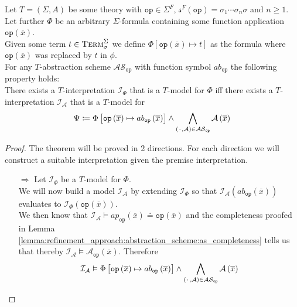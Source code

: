 \begin{theorem}
\label{theorem:abstractions:scheme:equivalence}
Let $T=\left(\Sigma,A\right)$ be some theory with $\texttt{op}\in\Sigma^F$, $\mathcal{s}^F\left(\texttt{op}\right)=\sigma_1\dotsi\sigma_n\sigma$ and $n\geq1$.\\
Let further $\Phi$ be an arbitrary $\Sigma$-formula containing some function application $\texttt{op}\left(\overline{x}\right)$.\\
Given some term $t\in\textsc{Term}_\sigma^\Sigma$ we define $\Phi\left[\texttt{op}\left(\overline{x}\right)\mapsto t \right]$ as the formula where $\texttt{op}\left(\overline{x}\right)$ was replaced by $t$ in $\phi$.\\
For any $T$-abstraction scheme $\mathcal{AS}_{\texttt{op}}$ with function symbol $ab_{\texttt{op}}$ the following property holds:\\
There exists a $T$-interpretation $\mathcal{I}_{\Phi}$ that is a $T$-model for $\Phi$ iff there exists a $T$-interpretation $\mathcal{I}_{\mathcal{A}}$ that is a $T$-model for 
\[
\Psi \coloneqq \Phi\left[ \texttt{op}\left(\overline{x}\right) \mapsto ab_{\texttt{op}}\left(\overline{x}\right) \right] \land \bigwedge\limits_{\left({\mkern 2mu\cdot\mkern 2mu},\mathcal{A}\right)\in\mathcal{AS}_{\texttt{op}}} \mathcal{A}\left(\overline{x}\right)
\]
\begin{proof}
The theorem will be proved in 2 directions. For each direction we will construct a suitable interpretation given the premise interpretation.
\begin{itemize}
    \item[$\Rightarrow$] Let $\mathcal{I}_{\Phi}$ be a $T$-model for $\Phi$.\\
        We will now build a model $\mathcal{I}_{\mathcal{A}}$ by extending $\mathcal{I}_{\Phi}$ so that $\mathcal{I}_\mathcal{A}\left(ab_{\texttt{op}}\left(\overline{x}\right)\right)$
        evaluates to $\mathcal{I}_{\Phi}\left(\texttt{op}\left(\overline{x}\right)\right)$.\\
        We then know that $\mathcal{I}_{\mathcal{A}} \vDash ap_{\texttt{op}}\left(\overline{x}\right) \doteq \texttt{op}\left(\overline{x}\right)$
        and the completeness proofed in Lemma \ref{lemma:refinement_approach:abstraction_scheme:as_completeness} tells us that thereby
        $\mathcal{I}_{\mathcal{A}} \vDash \mathcal{A}_{\texttt{op}}\left(\overline{x}\right)$.
        Therefore 
        \[
            \mathcal{I}_{\mathcal{A}} \vDash\Phi\left[ \texttt{op}\left(\overline{x}\right) \mapsto ab_{\texttt{op}}\left(\overline{x}\right) \right] \land \bigwedge\limits_{\left({\mkern 2mu\cdot\mkern 2mu},\mathcal{A}\right)\in\mathcal{AS}_{\texttt{op}}} \mathcal{A}\left(\overline{x}\right)
\]
\end{itemize}
\end{proof}
\end{theorem}
